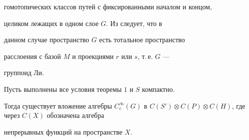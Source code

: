 гомотопических классов путей с фиксированными началом и концом,


целиком лежащих в одном слое $G$. Из \cite{MA} следует, что в


данном случае пространство $G$ есть тотальное пространство


расслоения с базой $M$ и проекциями $r$ или $s$, т.\,е. $G$ ---


группоид Ли.





\begin{thm}


Пусть выполнены все условия теоремы $1$ и $S$  компактно.


Тогда существует вложение алгебры $C^{\infty}_c(G)$ в $ C(S')


\otimes C(P) \otimes C(H)$, где через $C(X)$ обозначена алгебра


непрерывных функций на пространстве $X$.


\end{thm}





